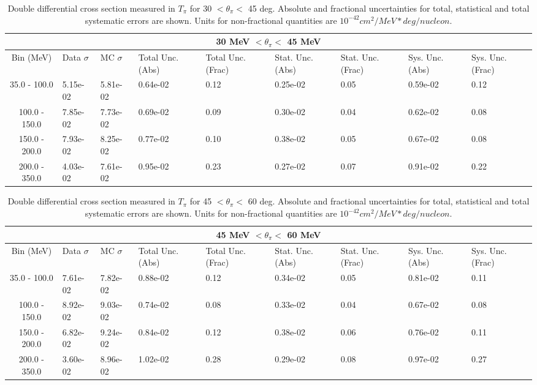 \begin{table}[!htb]
    \centering
    \tiny
    \begin{tabular}{|c|p{0.5in}|p{0.5in}|p{0.5in}|p{0.5in}|p{0.5in}|p{0.5in}|p{0.5in}|p{0.5in}|}

        \hline
        \multicolumn{9}{c}{30 MeV $ < \theta_\pi < $ 45 MeV}\\
        \hline
        Bin (MeV)& Data $\sigma$ & MC $\sigma$ & Total Unc. (Abs) & Total Unc. (Frac)  & Stat. Unc. (Abs) & Stat. Unc. (Frac) & Sys. Unc. (Abs) & Sys. Unc. (Frac)\\ \hline
35.0 - 100.0 & 5.15e-02 & 5.81e-02 & 0.64e-02 & 0.12 & 0.25e-02 & 0.05 & 0.59e-02 & 0.12\\ \hline
100.0 - 150.0 & 7.85e-02 & 7.73e-02 & 0.69e-02 & 0.09 & 0.30e-02 & 0.04 & 0.62e-02 & 0.08\\ \hline
150.0 - 200.0 & 7.93e-02 & 8.25e-02 & 0.77e-02 & 0.10 & 0.38e-02 & 0.05 & 0.67e-02 & 0.08\\ \hline
200.0 - 350.0 & 4.03e-02 & 7.61e-02 & 0.95e-02 & 0.23 & 0.27e-02 & 0.07 & 0.91e-02 & 0.22\\ \hline


    \end{tabular}
    \caption{Double differential cross section measured in $T_\pi$ for 30 $ < \theta_\pi < $ 45 deg. Absolute and fractional uncertainties for total, statistical and total systematic errors are shown. Units for non-fractional quantities are $10^{-42}cm^2/MeV*deg/nucleon$.}
    \label{tab:ApdxA:XSecTable2Dtpithetapi3}
\end{table}

\begin{table}[!htb]
    \centering
    \tiny
    \begin{tabular}{|c|p{0.5in}|p{0.5in}|p{0.5in}|p{0.5in}|p{0.5in}|p{0.5in}|p{0.5in}|p{0.5in}|}

        \hline
        \multicolumn{9}{c}{45 MeV $ < \theta_\pi < $ 60 MeV}\\
        \hline
        Bin (MeV)& Data $\sigma$ & MC $\sigma$ & Total Unc. (Abs) & Total Unc. (Frac)  & Stat. Unc. (Abs) & Stat. Unc. (Frac) & Sys. Unc. (Abs) & Sys. Unc. (Frac)\\ \hline
35.0 - 100.0 & 7.61e-02 & 7.82e-02 & 0.88e-02 & 0.12 & 0.34e-02 & 0.05 & 0.81e-02 & 0.11\\ \hline
100.0 - 150.0 & 8.92e-02 & 9.03e-02 & 0.74e-02 & 0.08 & 0.33e-02 & 0.04 & 0.67e-02 & 0.08\\ \hline
150.0 - 200.0 & 6.82e-02 & 9.24e-02 & 0.84e-02 & 0.12 & 0.38e-02 & 0.06 & 0.76e-02 & 0.11\\ \hline
200.0 - 350.0 & 3.60e-02 & 8.96e-02 & 1.02e-02 & 0.28 & 0.29e-02 & 0.08 & 0.97e-02 & 0.27\\ \hline


    \end{tabular}
    \caption{Double differential cross section measured in $T_\pi$ for 45 $ < \theta_\pi < $ 60 deg. Absolute and fractional uncertainties for total, statistical and total systematic errors are shown. Units for non-fractional quantities are $10^{-42}cm^2/MeV*deg/nucleon$.}
    \label{tab:ApdxA:XSecTable2Dtpithetapi4}
\end{table}

